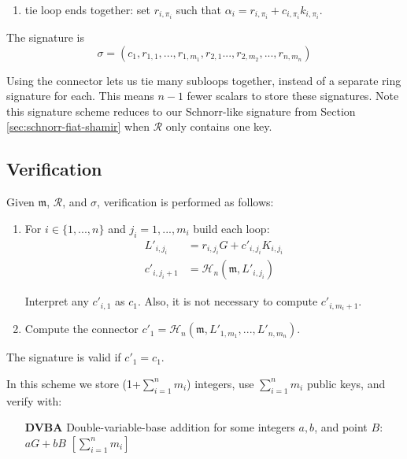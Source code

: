 \begin{enumerate}
\begin{enumerate}
 	    \item tie loop ends together: set $r_{i, \pi_i}$ such that $\alpha_i = r_{i, \pi_i} + c_{i, \pi_{i}} k_{i, \pi_i}$.
	 \end{enumerate} 
 
\end{enumerate}

The signature is
 \[\sigma = (c_1, r_{1, 1}, ..., r_{1, m_1}, r_{2,1} ..., r_{2,m_2}, ..., r_{n, m_n} )  \]

Using the connector lets us tie many subloops together, instead of a separate ring signature for each. This means $n-1$ fewer scalars to store these signatures. Note this signature scheme reduces to our Schnorr-like signature from Section \ref{sec:schnorr-fiat-shamir} when $\mathcal{R}$ only contains one key.

\subsection*{Verification}

Given \(\mathfrak{m}\), $\mathcal{R}$, and $\sigma$, verification is performed as follows:

\begin{enumerate}
	
	\item For \(i \in \{1, ..., n\} \) and \(j_i = 1, ..., m_i \) build each loop:\vspace{.2cm}
	\begin{align*}
	   L'_{i, j_i} &= r_{i, j_i} G + c'_{i, j_i} K_{i, j_i} \\
	   c'_{i, j_i+1} &= \mathcal{H}_n (\mathfrak{m}, L'_{i, j_i}) 
	\end{align*}
	
	Interpret any \(c'_{i, 1}\) as \(c_1\). Also, it is not necessary to compute $c'_{i, m_i+1}$.
	
	\item Compute the connector \(c'_1 = \mathcal{H}_n (\mathfrak{m}, L'_{1, m_1}, ..., L'_{n, m_n}) \).
	
\end{enumerate}

The signature is valid if \(c'_1 = c_1\).

In this scheme we store (1+$\sum^n_{i=1} m_i$) integers, use $\sum^n_{i=1} m_i$ public keys, and verify with:

\begin{itemize}
    \setlength\itemsep{\listspace}
    \item [\textbf{DVBA}] Double-variable-base addition for some integers $a, b$, and point $B$: $a G + b B$ \quad \([\sum^n_{i=1} m_i]\)
\end{itemize}


